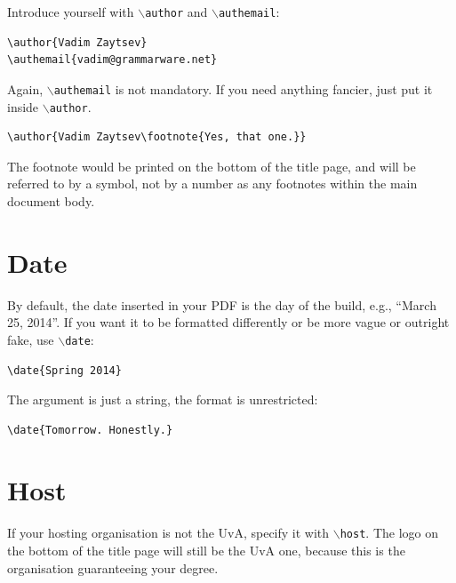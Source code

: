 \documentclass{uvamscse}
\newcommand{\cmd}[1]{\texttt{$\backslash$#1}}
\begin{document}
Introduce yourself with \cmd{author} and \cmd{authemail}:

\begin{snippet}
\begin{verbatim}
\author{Vadim Zaytsev}
\authemail{vadim@grammarware.net}
\end{verbatim}
\end{snippet}

Again, \cmd{authemail} is not mandatory. If you need anything fancier, just put it inside \cmd{author}.

\begin{snippet}
\begin{verbatim}
\author{Vadim Zaytsev\footnote{Yes, that one.}}
\end{verbatim}
\end{snippet}

The footnote would be printed on the bottom of the title page, and will be
referred to by a symbol, not by a number as any footnotes within the main
document body.

\section{Date}

By default, the date inserted in your PDF is the day of the build, e.g., ``March 25, 2014''. If you want it to be formatted differently or be more vague or outright fake, use \cmd{date}:

\begin{snippet}
\begin{verbatim}
\date{Spring 2014}
\end{verbatim}
\end{snippet}

The argument is just a string, the format is unrestricted:

\begin{snippet}
\begin{verbatim}
\date{Tomorrow. Honestly.}
\end{verbatim}
\end{snippet}

\section{Host}

If your hosting organisation is not the UvA, specify it with \cmd{host}. The
logo on the bottom of the title page will still be the UvA one, because this
is the organisation guaranteeing your degree.
\end{document}
